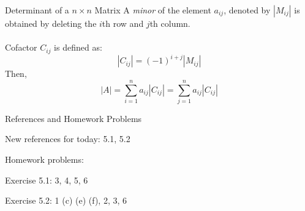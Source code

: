 \documentclass{./../../Latex/teaching_slides}
\begin{document}
 \begin{frame}{Determinant of a $n \times n$ Matrix}
A \textit{minor} of the element $a_{ij}$, denoted by $|M_{ij}|$ is obtained by deleting the $i$th row and $j$th column. \\~\\
Cofactor $C_{ij}$ is defined as:
$$ |C_{ij}| = (-1)^{i+j} |M_{ij}| $$
 Then, 
 $$|A| = \sum_{i=1}^n a_{ij} |C_{ij}| = \sum_{j=1}^n a_{ij} |C_{ij}| $$
 \end{frame}

 
\begin{frame}{References and Homework Problems}
\begin{witemize}
\item New references for today: 5.1, 5.2
\item Homework problems: \\
\begin{witemize}
\normalsize
\item Exercise 5.1: 3, 4, 5, 6
\item Exercise 5.2: 1 (c) (e) (f), 2, 3, 6
\end{witemize}

\end{witemize}
\end{frame}
\end{document}
